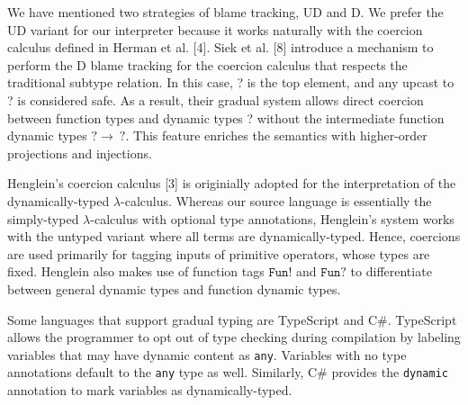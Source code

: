We have mentioned two 
strategies of blame tracking, UD and D. We 
prefer the UD variant for our interpreter because it works 
naturally with the coercion calculus defined in Herman et al. [4]. 
Siek et al. [8] introduce a mechanism to perform the D blame 
tracking for the coercion calculus that respects the traditional 
subtype relation. In this case, ? 
is the top element, and any upcast to ? is considered safe. 
As a result, their gradual system allows direct 
coercion between function types and dynamic types ? without the 
intermediate function dynamic types $? \rightarrow \: ?$. This feature 
enriches the semantics with higher-order projections and 
injections.

Henglein's coercion calculus [3] is originially adopted for the 
interpretation of the dynamically-typed $\lambda$-calculus. 
Whereas our source language is essentially the 
simply-typed $\lambda$-calculus with optional type annotations, 
Henglein's system works with the untyped variant where 
all terms are dynamically-typed. Hence, coercions are used 
primarily for tagging inputs of primitive operators, whose 
types are fixed. Henglein also makes use of function tags 
$\texttt{Fun}!$ and $\texttt{Fun}?$ to differentiate between 
general dynamic types and function dynamic types.

Some languages that support gradual typing are TypeScript and 
C\#. TypeScript allows the programmer to opt out of type checking 
during compilation by labeling variables that may have dynamic 
content as \texttt{any}. Variables with no type annotations 
default to the \texttt{any} type as well. Similarly, C\# provides
the \texttt{dynamic} annotation to mark variables as dynamically-typed. 


